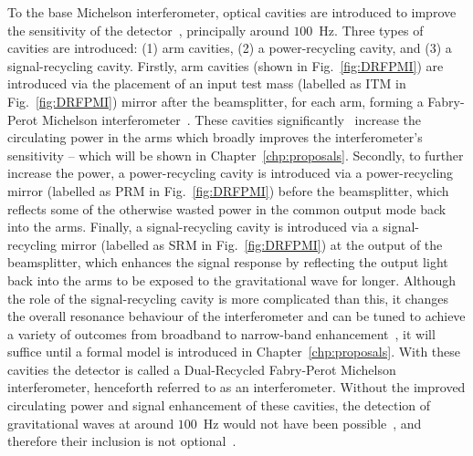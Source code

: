 To the base Michelson interferometer, optical cavities are introduced to improve the sensitivity of the detector~\cite{}, principally around $100$~Hz. Three types of cavities are introduced: (1) arm cavities, (2) a power-recycling cavity, and (3) a signal-recycling cavity. 
Firstly, arm cavities (shown in Fig.~\ref{fig:DRFPMI}) are introduced via the placement of an input test mass (labelled as ITM in Fig.~\ref{fig:DRFPMI}) mirror after the beamsplitter, for each arm, forming a Fabry-Perot Michelson interferometer~\cite{}. These cavities significantly~\cite{} increase the circulating power in the arms which broadly improves the interferometer's sensitivity -- which will be shown in Chapter~\ref{chp:proposals}. 
Secondly, to further increase the power, a power-recycling cavity is introduced via a power-recycling mirror (labelled as PRM in Fig.~\ref{fig:DRFPMI}) before the beamsplitter, which reflects some of the otherwise wasted power in the common output mode back into the arms. 
Finally, a signal-recycling cavity is introduced via a signal-recycling mirror (labelled as SRM in Fig.~\ref{fig:DRFPMI}) at the output of the beamsplitter, which enhances the signal response by reflecting the output light back into the arms to be exposed to the gravitational wave for longer. Although the role of the signal-recycling cavity is more complicated than this, it changes the overall resonance behaviour of the interferometer and can be tuned to achieve a variety of outcomes from broadband to narrow-band enhancement~\cite{}, it will suffice until a formal model is introduced in Chapter~\ref{chp:proposals}. 
With these cavities the detector is called a Dual-Recycled Fabry-Perot Michelson interferometer, henceforth referred to as an interferometer. Without the improved circulating power and signal enhancement of these cavities, the detection of gravitational waves at around $100$~Hz would not have been possible~\cite{}, and therefore their inclusion is not optional~\cite{}. 

